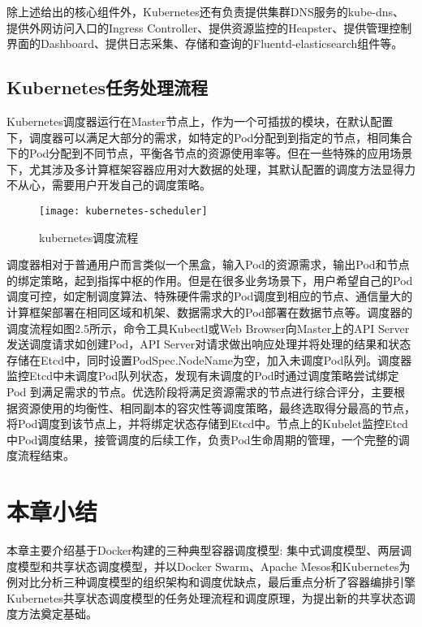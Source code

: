 除上述给出的核心组件外，Kubernetes还有负责提供集群DNS服务的kube-dns、提供外网访问入口的Ingress Controller、提供资源监控的Heapster、提供管理控制界面的Dashboard、提供日志采集、存储和查询的Fluentd-elasticsearch组件等。

\subsection{Kubernetes任务处理流程}
Kubernetes调度器运行在Master节点上，作为一个可插拔的模块，在默认配置下，调度器可以满足大部分的需求，如特定的Pod分配到到指定的节点，相同集合下的Pod分配到不同节点，平衡各节点的资源使用率等。但在一些特殊的应用场景下，尤其涉及多计算框架容器应用对大数据的处理，其默认配置的调度方法显得力不从心，需要用户开发自己的调度策略。
\begin{figure}[H] %
	\centering
	\texttt{[image: kubernetes-scheduler]}
	\caption{kubernetes调度流程}
\end{figure}
调度器相对于普通用户而言类似一个黑盒，输入Pod的资源需求，输出Pod和节点的绑定策略，起到指挥中枢的作用。但是在很多业务场景下，用户希望自己的Pod调度可控，如定制调度算法、特殊硬件需求的Pod调度到相应的节点、通信量大的计算框架部署在相同区域和机架、数据需求大的Pod部署在数据节点等。调度器的调度流程如图2.5所示，命令工具Kubectl或Web Browser向Master上的API Server发送调度请求如创建Pod，API Server对请求做出响应处理并将处理的结果和状态存储在Etcd中，同时设置PodSpec.NodeName为空，加入未调度Pod队列。调度器监控Etcd中未调度Pod队列状态，发现有未调度的Pod时通过调度策略尝试绑定Pod 到满足需求的节点。优选阶段将满足资源需求的节点进行综合评分，主要根据资源使用的均衡性、相同副本的容灾性等调度策略，最终选取得分最高的节点，将Pod调度到该节点上，并将绑定状态存储到Etcd中。节点上的Kubelet监控Etcd中Pod调度结果，接管调度的后续工作，负责Pod生命周期的管理，一个完整的调度流程结束。

\section{本章小结}

本章主要介绍基于Docker构建的三种典型容器调度模型: 集中式调度模型、两层调度模型和共享状态调度模型，并以Docker Swarm、Apache Mesos和Kubernetes为例对比分析三种调度模型的组织架构和调度优缺点，最后重点分析了容器编排引擎Kubernetes共享状态调度模型的任务处理流程和调度原理，为提出新的共享状态调度方法奠定基础。




